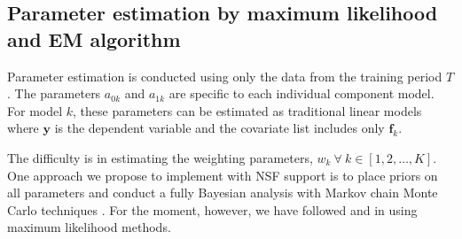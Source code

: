 \documentclass[pdftex,12pt,fullpage,oneside]{amsart}
\begin{document}











\subsection{Parameter estimation by maximum likelihood and EM
algorithm}

Parameter estimation is conducted using only the data from the
training period $T$.  The parameters $a_{0k}$ and $a_{1k}$ are
specific to each individual component model.  For model $k$, these
parameters can be estimated as traditional linear models where $\mathbf{y}$ is
the dependent variable and the covariate list includes only $\mathbf{f}_k$.

The difficulty is in estimating the weighting parameters,
$w_k~\forall~ k \in [1, 2, \dots, K]$. One approach we
propose to implement with NSF support is to place priors on all
parameters and conduct a fully Bayesian analysis with Markov chain
Monte Carlo techniques \citep[c.f.][]{Vrugt:2008}.  For the moment,
however, we have followed \citet{Raftery:2005} and
\citet{Sloughter:2007} in using maximum likelihood methods.
\end{document}
